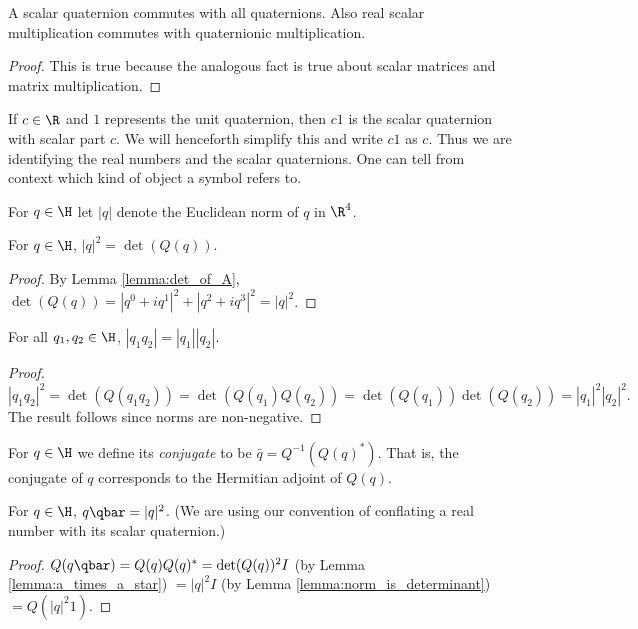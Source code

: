 \documentclass[oneside,12pt]{amsart}
\begin{document}
\begin{lemma}
\label{corollary:scalars_commute}
A scalar quaternion commutes with all quaternions.
Also real scalar multiplication commutes with quaternionic multiplication.
\end{lemma}
\begin{proof}
This is true because the analogous fact is true about
scalar matrices and matrix multiplication.
\end{proof}

\begin{remark}
If $c\in \R$ and $1$ represents the unit quaternion, then $c 1$ is the scalar quaternion
with scalar part $c$. We will henceforth simplify this and write $c 1$ as $c$.
Thus we are identifying the real numbers and the scalar quaternions. One can tell from
context which kind of object a symbol refers to.
\end{remark}


\begin{definition}
For $q\in\H$ let $|q|$ denote the Euclidean norm of $q$ in $\R^4$.
\end{definition}

\begin{lemma}
\label{lemma:norm_is_determinant}
For $q\in\H$, $|q|^2 = \det(Q(q))$.
\end{lemma}
\begin{proof}
By Lemma \ref{lemma:det_of_A},
$\det(Q(q)) = |q^0 + iq^1|^2 + |q^2 + iq^3|^2 = |q|^2$.
\end{proof}

\begin{lemma}
For all $q_1,q_2 \in \H$, $|q_1 q_2| = |q_1| |q_2|$.
\end{lemma}
\begin{proof}
$|q_1 q_2|^2 = \det(Q(q_1 q_2)) = \det(Q(q_1) Q(q_2)) = \det(Q(q_1))\det(Q(q_2)) = |q_1|^2 |q_2|^2.$
The result follows since norms are non-negative.
\end{proof}

\begin{definition}
For $q\in\H$ we define its \emph{conjugate} to be $\bar{q} = Q^{-1}(Q(q)^{*})$.
That is, the conjugate of $q$ corresponds to the Hermitian adjoint of $Q(q)$.
\end{definition}

\begin{corollary}
\label{corollary:q_times_qbar}
 For $q\in\H$,  $q \qbar = |q|^2 $. (We are using our convention of conflating a real number with its scalar quaternion.)
 \end{corollary}
 \begin{proof}  $Q(q \qbar) = Q(q) Q(q)^* = \det(Q(q))^2 I$ (by Lemma \ref{lemma:a_times_a_star})
 $= |q|^2 I$ (by Lemma \ref{lemma:norm_is_determinant}) $ = Q(|q|^2 1)$.
 \end{proof}
\end{document}
